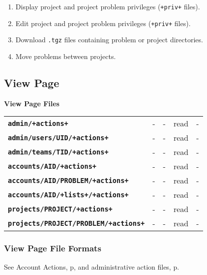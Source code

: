 \documentclass[12pt]{article}
\newenvironment{indpar}[1][0.4in]%
	{\begin{list}{}%
		     {\setlength{\itemsep}{0in}%
		      \setlength{\topsep}{0in}%
		      \setlength{\parsep}{1ex}%
		      \setlength{\labelwidth}{#1}%
		      \setlength{\leftmargin}{#1}%
		      \addtolength{\leftmargin}{\labelsep}}%
	 \item}%
	{\end{list}}
\newcommand{\TT}[1]{{\tt \bfseries #1}}
\newcommand{\pagref}[1]{p\pageref{#1}}
\begin{document}
\begin{enumerate}
\item Display project and project problem privileges ({\tt +priv+} files).
\item Edit project and project problem privileges ({\tt +priv+} files).
\item Download {\tt .tgz} files containing problem or project directories.
\item Move problems between projects.
\end{enumerate}

\newpage

\subsection{View Page}

\begin{center}

{\bf View Page Files}

\begin{tabular}{lllll}
\TT{admin/+actions+}    		& -       & -      & read & - \\
\TT{admin/users/UID/+actions+} 		& -       & -      & read & - \\
\TT{admin/teams/TID/+actions+} 		& -       & -      & read & - \\
\TT{accounts/AID/+actions+}    		& -       & -      & read & - \\
\TT{accounts/AID/PROBLEM/+actions+}	& -       & -      & read & - \\
\TT{accounts/AID/+lists+/+actions+}	& -       & -      & read & - \\
\TT{projects/PROJECT/+actions+}    	& -       & -      & read & - \\
\TT{projects/PROJECT/PROBLEM/+actions+} & -       & -      & read & - \\
\end{tabular}


\end{center}

\subsubsection{View Page File Formats}

\begin{indpar}
See Account Actions, \pagref{ACCOUNT-ACTIONS}, and
administrative action files, \pagref{ADMIN/XXXX/XID/ACTIONS}.
\end{indpar}
\end{document}
